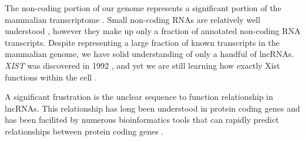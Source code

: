 The non-coding portion of our genome represents a significant portion of the mammalian transcriptome \cite{Rinn2012GenomeRNAs}. Small non-coding RNAs are relatively well understood \cite{Rinn2012GenomeRNAs}, however they make up only a fraction of annotated non-coding RNA transcripts. Despite representing a large fraction of known transcripts in the mammalian genome, we have solid understanding of only a handful of lncRNAs. \emph{XIST} was discovered in 1992 \cite{Brown10TheNucleus.}, and yet we are still learning how exactly Xist functions within the cell \cite{Schertzer2019LncRNA-InducedDNA,DaRocha2017NovelConformation}. 

A significant frustration is the unclear sequence to function relationship in lncRNAs. This relationship has long been understood in protein coding genes \cite{Whisstock2003PredictionStructure} and has been facilited by numerous bioinformatics tools that can rapidly predict relationships between protein coding genes \cite{Altschul1990BasicTool,Smith1981IdentificationSubsequences,Wheeler2013Nhmmer:HMMs,Yi2013Co-phylog:Organisms,Qi2004WholeApproach}. 

\begin{singlespace}
\printbibliography[heading=bibintoc,title={References}]
\end{singlespace}